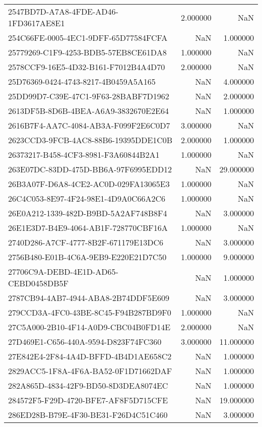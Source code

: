\begin{tabular}{lrr}
2547BD7D-A7A8-4FDE-AD46-1FD3617AE8E1 & 2.000000 & NaN \\
254C66FE-0005-4EC1-9DFF-65D77584FCFA & NaN & 1.000000 \\
25779269-C1F9-4253-BDB5-57EB8CE61DA8 & 1.000000 & NaN \\
2578CCF9-16E5-4D32-B161-F7012B4A4D70 & 2.000000 & NaN \\
25D76369-0424-4743-8217-4B0459A5A165 & NaN & 4.000000 \\
25DD99D7-C39E-47C1-9F63-28BABF7D1962 & NaN & 2.000000 \\
2613DF5B-8D6B-4BEA-A6A9-3832670E2E64 & NaN & 1.000000 \\
2616B7F4-AA7C-4084-AB3A-F099F2E6C0D7 & 3.000000 & NaN \\
2623CCD3-9FCB-4AC8-88B6-19395DDE1C0B & 2.000000 & 1.000000 \\
26373217-B458-4CF3-8981-F3A60844B2A1 & 1.000000 & NaN \\
263E07DC-83DD-475D-BB6A-97F6995EDD12 & NaN & 29.000000 \\
26B3A07F-D6A8-4CE2-AC0D-029FA13065E3 & 1.000000 & NaN \\
26C4C053-8E97-4F24-98E1-4D9A0C66A2C6 & 1.000000 & NaN \\
26E0A212-1339-482D-B9BD-5A2AF748B8F4 & NaN & 3.000000 \\
26E1E3D7-B4E9-4064-AB1F-728770CBF16A & 1.000000 & NaN \\
2740D286-A7CF-4777-8B2F-671179E13DC6 & NaN & 3.000000 \\
2756B480-E01B-4C6A-9EB9-E220E21D7C50 & 1.000000 & 9.000000 \\
27706C9A-DEBD-4E1D-AD65-CEBD0458DB5F & NaN & 1.000000 \\
2787CB94-4AB7-4944-ABA8-2B74DDF5E609 & NaN & 3.000000 \\
279CCD3A-4FC0-43BE-8C45-F94B287BD9F0 & 1.000000 & NaN \\
27C5A000-2B10-4F14-A0D9-CBC04B0FD14E & 2.000000 & NaN \\
27D469E1-C656-440A-9594-D823F74FC360 & 3.000000 & 11.000000 \\
27E842E4-2F84-4A4D-BFFD-4B4D1AE658C2 & NaN & 1.000000 \\
2829ACC5-1F8A-4F6A-BA52-0F1D71662DAF & NaN & 1.000000 \\
282A865D-4834-42F9-BD50-8D3DEA8074EC & NaN & 1.000000 \\
284572F5-F29D-4720-BFE7-AF8F5D715CFE & NaN & 19.000000 \\
286ED28B-B79E-4F30-BE31-F26D4C51C460 & NaN & 3.000000 \\

\end{tabular}
